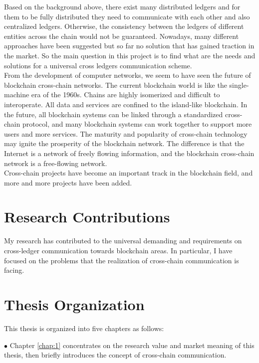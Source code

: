 \noindent Based on the background above, there exist many distributed ledgers and for them to be fully distributed they need to communicate with each other and also centralized ledgers. Otherwise, the consistency between the ledgers of different entities across the chain would not be guaranteed. Nowadays, many different approaches have been suggested but so far no solution that has gained traction in the market.
So the main question in this project is to find what are the needs and solutions for a universal cross ledgers communication scheme.\\
\noindent From the development of computer networks, we seem to have seen the future of blockchain cross-chain networks. The current blockchain world is like the single-machine era of the 1960s. Chains are highly isomerized and difficult to interoperate. All data and services are confined to the island-like blockchain. In the future, all blockchain systems can be linked through a standardized cross-chain protocol, and many blockchain systems can work together to support more users and more services. The maturity and popularity of cross-chain technology may ignite the prosperity of the blockchain network. The difference is that the Internet is a network of freely flowing information, and the blockchain cross-chain network is a free-flowing network.\\
\noindent Cross-chain projects have become an important track in the blockchain field, and more and more projects have been added.

\section{Research Contributions}

\noindent My research has contributed to the universal demanding and requirements on cross-ledger communication towards blockchain areas. In particular, I have focused on the problems that the realization of cross-chain communication is facing.  

\section{Thesis Organization}

This thesis is organized into five chapters as follows:

$\bullet $ Chapter \ref{chap:1} concentrates on the research value and market meaning of this thesis, then briefly introduces the concept of cross-chain communication.

